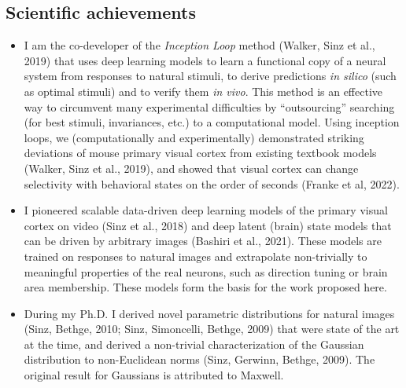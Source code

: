 \documentclass[COG,11pt]{ercgrant}
\begin{document}
\subsection{Scientific achievements}
\begin{itemize}[topsep=0pt,itemsep=0.62ex,partopsep=0ex,parsep=0.5ex]
    \item I am the co-developer of the \textit{Inception Loop} method (Walker, Sinz et al., 2019) that uses deep learning models to learn a functional copy of a neural system from responses to natural stimuli, to derive predictions \textit{in silico} (such as optimal stimuli) and to verify them \textit{in vivo}. This method is an effective way to circumvent many experimental difficulties by ``outsourcing'' searching (for best stimuli, invariances, etc.) to a computational model.    
    Using inception loops, we (computationally and experimentally) demonstrated striking deviations of mouse primary visual cortex from existing textbook models (Walker, Sinz et al., 2019), and showed that visual cortex can change selectivity with behavioral states on the order of seconds (Franke et al, 2022).
    \item I pioneered scalable data-driven deep learning models of the primary visual cortex on video (Sinz et al., 2018) and deep latent (brain) state models that can be driven by arbitrary images (Bashiri et al., 2021). These models are trained on responses to natural images and extrapolate non-trivially to meaningful properties of the real neurons, such as direction tuning or brain area membership. These models form the basis for the work proposed here.  
    \item During my Ph.D. I derived novel parametric distributions for natural images (Sinz, Bethge, 2010; Sinz, Simoncelli, Bethge, 2009) that were state of the art at the time, and derived a non-trivial characterization of the Gaussian distribution to non-Euclidean norms (Sinz, Gerwinn, Bethge, 2009). The original result for Gaussians is attributed to Maxwell.
\end{itemize}





\end{document}
